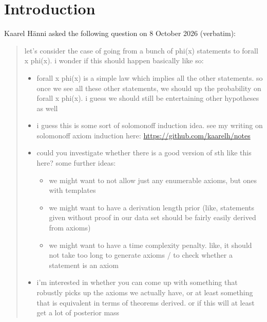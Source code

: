 
\section{Introduction}\label{sec:intro}

Kaarel H\"anni asked the following question on 8 October 2026 (verbatim):

\begin{quote}\footnotesize
let's consider the case of going from a bunch of phi(x) statements to forall x phi(x). i wonder if this should happen basically like so:
\begin{itemize}[itemsep=0pt,topsep=1pt]
\item forall x phi(x) is a simple law which implies all the other statements. so once we see all these other statements, we should up the probability on forall x phi(x). i guess we should still be entertaining other hypotheses as well
\item i guess this is some sort of solomonoff induction idea. see my writing on solomonoff axiom induction here: \url{https://github.com/kaarelh/notes}
\item could you investigate whether there is a good version of sth like this here? some further ideas:
\begin{itemize}[itemsep=0pt,topsep=0pt]
\item we might want to not allow just any enumerable axioms, but ones with templates
\item we might want to have a derivation length prior (like, statements given without proof in our data set should be fairly easily derived from axioms)
\item we might want to have a time complexity penalty. like, it should not take too long to generate axioms / to check whether a statement is an axiom
\end{itemize}
\item i'm interested in whether you can come up with something that robustly picks up the axioms we actually have, or at least something that is equivalent in terms of theorems derived. or if this will at least get a lot of posterior mass
\end{itemize}
\end{quote}

